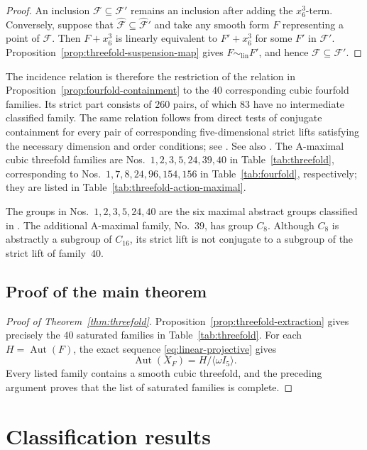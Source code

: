 \documentclass[12pt]{amsart}
\numberwithin{equation}{section}
\theoremstyle{plain}
\theoremstyle{definition}
\theoremstyle{remark}
\newcommand{\calF}{\mathcal F}
\DeclareMathOperator{\Aut}{Aut}
\begin{document}
\begin{proof}
An inclusion $\calF\subseteq\calF'$ remains an inclusion after
adding the $x_6^3$-term.  Conversely, suppose that
$\widehat{\calF}\subseteq\widehat{\calF}'$ and take any smooth
form $F$ representing a point of $\calF$. Then $F+x_6^3$ is linearly equivalent to $F'+x_6^3$
for some $F'$ in $\calF'$.  Proposition~\ref{prop:threefold-suspension-map}
gives $F\sim_{\mathrm{lin}}F'$, and hence $\calF\subseteq\calF'$.
\end{proof}

The incidence relation is therefore the restriction of the relation in
Proposition~\ref{prop:fourfold-containment} to the $40$ corresponding
cubic fourfold families.  Its strict part consists of $260$ pairs, of
which $83$ have no intermediate classified family.  The same relation
follows from direct tests of conjugate containment for every pair of
corresponding five-dimensional strict lifts satisfying the necessary dimension
and order conditions; see \cite{FuWangZhengAutcub4fold2026}.
See also .
The A-maximal cubic threefold families are
Nos.~$1,2,3,5,24,39,40$ in Table~\ref{tab:threefold}, corresponding to
Nos.~$1,7,8,24,96,154,156$ in Table~\ref{tab:fourfold}, respectively;
they are listed in Table~\ref{tab:threefold-action-maximal}.

The groups in Nos.~$1,2,3,5,24,40$ are the six maximal abstract groups
classified in \cite[Theorem~1.1]{LiYuThreefold}.
The additional A-maximal family, No.~$39$, has group $C_8$.
Although $C_8$ is abstractly a subgroup of $C_{16}$, its strict lift is not
conjugate to a subgroup of the strict lift of family~$40$.

\subsection{Proof of the main theorem}

\begin{proof}[Proof of Theorem~\ref{thm:threefold}]
Proposition~\ref{prop:threefold-extraction} gives precisely the \(40\)
saturated families in Table~\ref{tab:threefold}.  For each
\(H=\Aut(F)\), the exact sequence \eqref{eq:linear-projective} gives
\[
 \Aut(X_F)=H/\langle\omega I_5\rangle.
\]
Every listed family contains a smooth cubic threefold, and the preceding
argument proves that the list of saturated families is complete.
\end{proof}


\section{Classification results}\label{sec:tables}
\end{document}
